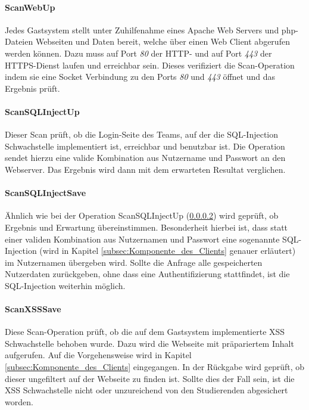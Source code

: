 \paragraph{ScanWebUp}\label{para:ScanWebUp}
Jedes Gastsystem stellt unter Zuhilfenahme eines Apache Web Servers und php-Dateien Webseiten und Daten bereit, welche über einen Web Client abgerufen werden können. Dazu muss auf Port \textit{80} der HTTP- und auf Port \textit{443} der HTTPS-Dienst laufen und erreichbar sein. Dieses verifiziert die Scan-Operation indem sie eine Socket Verbindung zu den Ports \textit{80} und \textit{443} öffnet und das Ergebnis prüft.

\paragraph{ScanSQLInjectUp}\label{para:ScanSQLInjectUp}
Dieser Scan prüft, ob die Login-Seite des Teams, auf der die SQL-Injection Schwachstelle implementiert ist, erreichbar und benutzbar ist. Die Operation sendet hierzu eine valide Kombination aus Nutzername und Passwort an den Webserver. Das Ergebnis wird dann mit dem erwarteten Resultat verglichen.

\paragraph{ScanSQLInjectSave}\label{para:ScanSQLInjectSave}
Ähnlich wie bei der Operation ScanSQLInjectUp (\ref{para:ScanSQLInjectUp}) wird geprüft, ob Ergebnis und Erwartung übereinstimmen. Besonderheit hierbei ist, dass statt einer validen Kombination aus Nutzernamen und Passwort eine sogenannte SQL-Injection (wird in Kapitel \ref{subsec:Komponente_des_Clients} genauer erläutert) im Nutzernamen übergeben wird.  
Sollte die Anfrage alle gespeicherten Nutzerdaten zurückgeben, ohne dass eine Authentifizierung stattfindet, ist die SQL-Injection weiterhin möglich.

\paragraph{ScanXSSSave}\label{para:ScanXSSSave}
Diese Scan-Operation prüft, ob die auf dem Gastsystem implementierte XSS Schwachstelle behoben wurde. Dazu wird die Webseite mit präpariertem Inhalt aufgerufen. Auf die Vorgehensweise wird in Kapitel \ref{subsec:Komponente_des_Clients} eingegangen.
In der Rückgabe wird geprüft, ob dieser ungefiltert auf der Webseite zu finden ist. Sollte dies der Fall sein, ist die XSS Schwachstelle nicht oder unzureichend von den Studierenden abgesichert worden.

